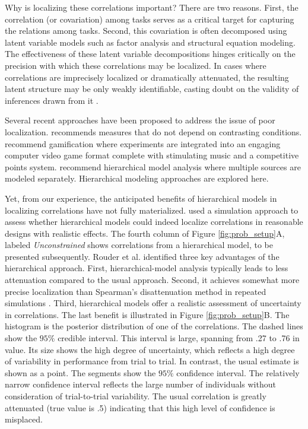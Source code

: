 \documentclass[man, 12pt]{apa7} %
\begin{document}
Why is localizing these correlations important?  There are two reasons.  First, the correlation (or covariation) among tasks serves as a critical target for capturing the relations among tasks.  Second, this covariation is often decomposed using latent variable models such as factor analysis and structural equation modeling.  The effectiveness of these latent variable decompositions hinges critically on the precision with which these correlations may be localized. In cases where correlations are imprecisely localized or dramatically attenuated, the resulting latent structure may be only weakly identifiable, casting doubt on the validity of inferences drawn from it \parencite{Karr.etal.2018}.

Several recent approaches have been proposed to address the issue of poor localization.  \textcite{Draheim.etal.2019} recommends measures that do not depend on contrasting conditions. \textcite[]{Deveau.etal.2015, Kucina.etal.2023, Wells.etal.2021} recommend gamification where experiments are integrated into an engaging computer video game format complete with stimulating music and a competitive points system.  \textcite[]{Haines.etal.2023,Matzke.etal.2017,Rouder.Haaf.2019} recommend hierarchical model analysis where multiple sources are modeled separately.  Hierarchical modeling approaches are explored here.

Yet, from our experience, the anticipated benefits of hierarchical models in localizing correlations have not fully materialized. \textcite{Rouder.etal.2023} used a simulation approach to assess whether hierarchical models could indeed localize correlations in reasonable designs with realistic effects. The fourth column of Figure \ref{fig:prob_setup}A, labeled {\em Unconstrained} shows correlations from a hierarchical model, to be presented subsequently. Rouder et al. identified three key advantages of the hierarchical approach.  First, hierarchical-model analysis typically leads to less attenuation compared to the usual approach. Second, it achieves somewhat more precise localization than Spearman's disattenuation method in repeated simulations \parencite[]{Rouder.etal.2023}. Third, hierarchical models offer a realistic assessment of uncertainty in correlations. The last benefit is illustrated in Figure \ref{fig:prob_setup}B. The histogram is the posterior distribution of one of the correlations. The dashed lines show the $95\%$ credible interval.  This interval is large, spanning from .27 to .76 in value.  Its size shows the high degree of uncertainty, which reflects a high degree of variability in performance from trial to trial.  In contrast, the usual estimate is shown as a point.  The segments show the  $95\%$ confidence interval.  The relatively narrow confidence interval reflects the large number of individuals without consideration of trial-to-trial variability. The usual correlation is greatly attenuated (true value is .5) indicating that this high level of confidence is misplaced. 
\end{document}

